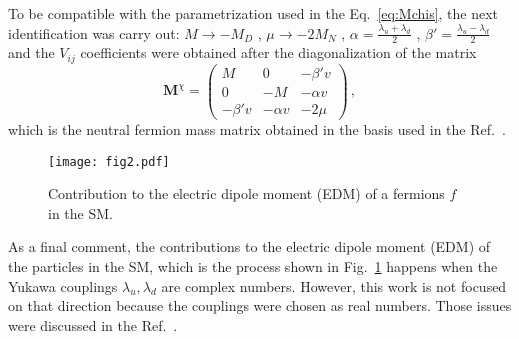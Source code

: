 To be compatible with the parametrization used in the Eq.~\eqref{eq:Mchis}, the next identification was carry out: $M\to -M_D$ , $\mu\to -2M_N$ , $\alpha=\frac{\lambda_u+\lambda_d}{2}$ , $\beta'=\frac{\lambda_u-\lambda_d}{2}$ and the $V_{ij}$ coefficients were obtained after the diagonalization of the matrix
%
\begin{equation}
 \mathbf{M}^{\chi}=\left(
\begin{array}{ccc}
M & 0 & -\beta' v \\
0 & -M & -\alpha v\\
-\beta' v & -\alpha v & -2 \mu
\end{array} \right) \,,
\end{equation}
which is the neutral fermion mass matrix obtained in the basis used in the Ref.~\cite{D'Eramo:2007ga}.

%
\begin{figure}[h]
\begin{center}
\texttt{[image: fig2.pdf]}
\end{center}
\caption{Contribution to the electric dipole moment (EDM) of a fermions $f$ in the SM.}
\label{fig:EDM}
\end{figure}
%

As a final comment, the contributions to the electric dipole moment (EDM) of the particles in the SM, which is the process shown in Fig.~\ref{fig:EDM}
happens when the Yukawa couplings $\lambda_u , \lambda_d$ are complex numbers. However, this work is not focused on that direction because the couplings were chosen as real numbers. Those issues were discussed in the Ref.~\cite{Abe:2014gua}.










